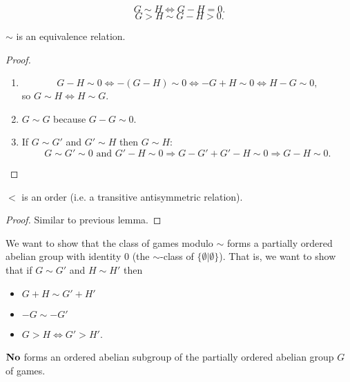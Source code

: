 \begin{definition}
\[ G \sim H \iff G - H = 0.\]
\[ G > H \sim G - H > 0.\]
\end{definition}

\begin{lemma}
${\sim}$ is an equivalence relation.
\end{lemma}
\begin{proof}
\begin{enumerate}
\item \[ G-H\sim 0 \iff -(G-H)\sim0 \iff -G+H\sim 0 \iff H-G\sim 0,\]
so $G\sim H \iff H\sim G$.
\item $G\sim G$ because $G-G\sim 0$.
\item If $G\sim G'$ and $G'\sim H$ then $G\sim H$:
\[ G\sim G'\sim 0 \text{ and } G'-H\sim 0 \Rightarrow G-G'+G'-H\sim 0 \Rightarrow G-H\sim 0.\]
\end{enumerate}
\end{proof}

\begin{lemma}
${<}$ is an order (i.e. a transitive antisymmetric relation).
\end{lemma}
\begin{proof}
Similar to previous lemma.
\end{proof}

We want to show that the class of games modulo ${\sim}$ forms a partially ordered abelian group with identity $0$ (the ${\sim}$-class of $\{\emptyset | \emptyset\}$).
That is, we want to show that if $G\sim G'$ and $H\sim H'$ then
\begin{itemize}
\item $G+H \sim G'+H'$
\item $-G\sim -G'$
\item $G>H \iff G'>H'$.
\end{itemize}

\begin{theorem}
$\mathbf{No}$ forms an ordered abelian subgroup of the partially ordered abelian group $G$ of games.
\end{theorem}

